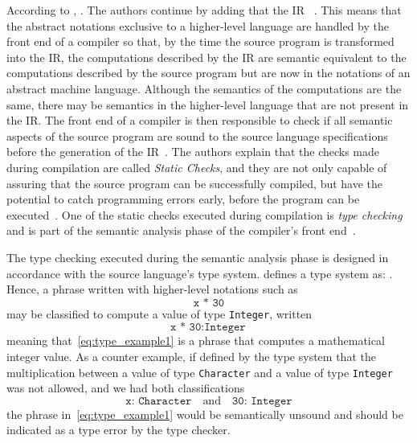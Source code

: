\documentclass[
  oneside,
  english,
  coorientadorbanca,
  embeddedlogo,
  noabntexcite
]{ufsc-thesis-rn46-2019}
\newcommand{\code}[1]{\texttt{#1}}
\begin{document}
According to \textcite{appel2003modern}, .
The authors continue by adding that the IR ~\cite{appel2003modern}.
This means that the abstract notations exclusive to a higher-level language are handled by the front end of a compiler so that, by the time the source program is transformed into the IR, the computations described by the IR are semantic equivalent to the computations described by the source program but are now in the notations of an abstract machine language.
Although the semantics of the computations are the same, there may be semantics in the higher-level language that are not present in the IR.\@
The front end of a compiler is then responsible to check if all semantic aspects of the source program are sound to the source language specifications before the generation of the IR~\cite{Aho:2006:CPT:1177220}.
The authors explain that the checks made during compilation are called \textit{Static Checks}, and they are not only capable of assuring that the source program can be successfully compiled, but have the potential to catch programming errors early, before the program can be executed~\cite{Aho:2006:CPT:1177220}. One of the static checks executed during compilation is \textit{type checking} and is part of the semantic analysis phase of the compiler's front end~\cite{appel2003modern}.

The type checking executed during the semantic analysis phase is designed in accordance with the source language's type system.
\textcite{pierce2002types} defines a type system as: .
Hence, a phrase written with higher-level notations such as
\begin{equation}\label{eq:type_example1}
  \code{x * 30}
\end{equation}
may be classified to compute a value of type \code{Integer}, written
\begin{equation*}
  \code{x * 30}:\code{Integer}
\end{equation*}
meaning that~\ref{eq:type_example1} is a phrase that computes a mathematical integer value.
As a counter example, if defined by the type system that the multiplication between a value of type \code{Character} and a value of type \code{Integer} was not allowed, and we had both classifications
\begin{equation*}
  \code{x: Character} \quad \textrm{and} \quad \code{30: Integer}
\end{equation*}
the phrase in~\ref{eq:type_example1} would be semantically unsound and should be indicated as a type error by the type checker.
\end{document}
